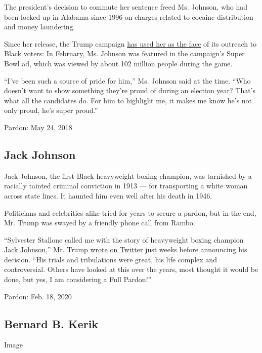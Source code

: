 The president's decision to commute her sentence freed Ms. Johnson, who
had been locked up in Alabama since 1996 on charges related to cocaine
distribution and money laundering.

Since her release, the Trump campaign
\href{https://www.nytimes.com/2020/02/06/us/politics/alice-johnson-trump-super-bowl-ad.html}{has
used her as the face} of its outreach to Black voters: In February, Ms.
Johnson was featured in the campaign's Super Bowl ad, which was viewed
by about 102 million people during the game.

``I've been such a source of pride for him,'' Ms. Johnson said at the
time. ``Who doesn't want to show something they're proud of during an
election year? That's what all the candidates do. For him to highlight
me, it makes me know he's not only proud, he's super proud.''

Pardon: May 24, 2018

\hypertarget{jack-johnson}{%
\subsection{Jack Johnson}\label{jack-johnson}}

Jack Johnson, the first Black heavyweight boxing champion, was tarnished
by a racially tainted criminal conviction in 1913 --- for transporting a
white woman across state lines. It haunted him even well after his death
in 1946.

Politicians and celebrities alike tried for years to secure a pardon,
but in the end, Mr. Trump was swayed by a friendly phone call from
Rambo.

``Sylvester Stallone called me with the story of heavyweight boxing
champion
\href{https://www.nytimes.com/2018/05/24/sports/jack-johnson-pardon-trump.html}{Jack
Johnson},'' Mr. Trump
\href{https://twitter.com/realDonaldTrump/status/987768453338673152}{wrote
on Twitter} just weeks before announcing his decision. ``His trials and
tribulations were great, his life complex and controversial. Others have
looked at this over the years, most thought it would be done, but yes, I
am considering a Full Pardon!''

Pardon: Feb. 18, 2020

\hypertarget{bernard-b-kerik}{%
\subsection{Bernard B. Kerik}\label{bernard-b-kerik}}

Image

